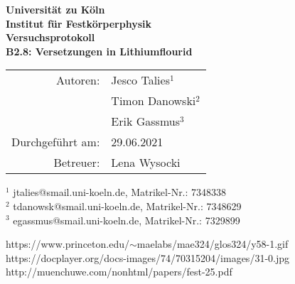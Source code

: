 ﻿\documentclass{article}
\begin{document}
 
 
\thispagestyle{empty}
\vspace*{\fill}
\begin{center}
	\Huge
	\textbf{Universität zu Köln}\\
	\LARGE
	\textbf{Institut für Festkörperphysik}\\
	\vspace{2cm}
	\textbf{Versuchsprotokoll}\\  
	\vspace{0.5cm}
	\large
	\textbf{B2.8: Versetzungen in Lithiumflourid}\\
	\normalsize
	\vspace{2cm}
	\begin{tabular}{r l}
		Autoren: 	& Jesco Talies$^1$\\
					& Timon Danowski$^2$\\
                    & Erik Gassmus$^3$\\
		Durchgeführt am:	& 29.06.2021\\
		Betreuer:	& Lena Wysocki
	\end{tabular}
\end{center}
\vfill\footnotesize
$^1$ jtalies@smail.uni-koeln.de, Matrikel-Nr.:  7348338\\
$^2$ tdanowsk@smail.uni-koeln.de, Matrikel-Nr.: 7348629\\
$^3$ egassmus@smail.uni-koeln.de, Matrikel-Nr.: 7329899\\
\normalsize

\newpage
\thispagestyle{empty}
\tableofcontents
\clearpage
\setcounter{page}{1}
  
   
  


% 

%



\begin{thebibliography}{9}
		https://www.princeton.edu/$\sim$maelabs/mae324/glos324/y58-1.gif
		https://docplayer.org/docs-images/74/70315204/images/31-0.jpg
		http://muenchuwe.com/nonhtml/papers/fest-25.pdf
\end{thebibliography}
\end{document}
